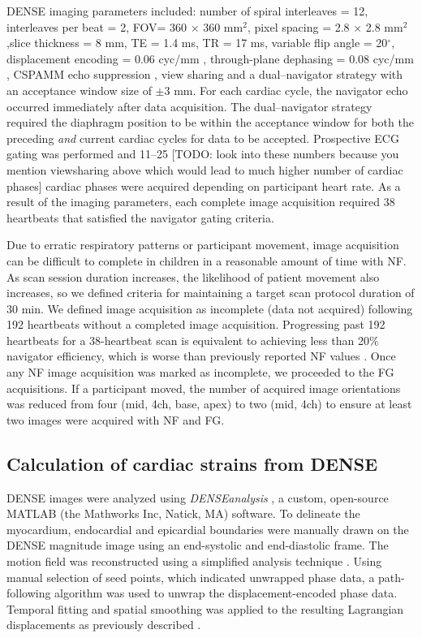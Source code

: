 	DENSE imaging parameters included: number of spiral interleaves = 12, interleaves per beat = 2, FOV= 360 × 360 mm$^2$, pixel spacing = 2.8 × 2.8 mm$^2$,slice thickness = 8 mm, TE = 1.4 ms, TR = 17 ms, variable flip angle = 20$^{\circ}$, displacement encoding = 0.06 cyc/mm \cite{Wehner2015a}, through-plane dephasing = 0.08 cyc/mm \cite{Zhong2006a}, CSPAMM echo suppression \cite{Kim2004}, view sharing and a dual--navigator strategy \cite{Hamlet2016a} with an acceptance window size of $\pm$3 mm. For each cardiac cycle, the navigator echo occurred immediately after data acquisition. The dual--navigator strategy required the diaphragm position to be within the acceptance window for both the preceding \textit{and} current cardiac cycles for data to be accepted. Prospective ECG gating was performed and 11--25 [TODO: look into these numbers because you mention viewsharing above which would lead to much higher number of cardiac phases] cardiac phases were acquired depending on participant heart rate. As a result of the imaging parameters, each complete image acquisition required 38 heartbeats that satisfied the navigator gating criteria.
	
	Due to erratic respiratory patterns or participant movement, image acquisition can be difficult to complete in children in a reasonable amount of time with NF. As scan session duration increases, the likelihood of patient movement also increases, so we defined criteria for maintaining a target scan protocol duration of 30 min. We defined image acquisition as incomplete (data not acquired) following 192 heartbeats without a completed image acquisition. Progressing past 192 heartbeats for a 38-heartbeat scan is equivalent to achieving less than 20\% navigator efficiency, which is worse than previously reported NF values \cite{Abd-Elmoniem2011,Feuerlein2009,Jhooti2011,Wang1996}. Once any NF image acquisition was marked as incomplete, we proceeded to the FG acquisitions. If a participant moved, the number of acquired image orientations was reduced from four (mid, 4ch, base, apex) to two (mid, 4ch) to ensure at least two images were acquired with NF and FG.

\subsection{Calculation of cardiac strains from DENSE}
	DENSE images were analyzed using \textit{DENSEanalysis} \cite{Gilliam2016a}, a custom, open-source MATLAB (the Mathworks Inc, Natick, MA) software. To delineate the myocardium, endocardial and epicardial boundaries were manually drawn on the DENSE magnitude image using an end-systolic and end-diastolic frame. The motion field was reconstructed using a simplified analysis technique \cite{Suever2014}. Using manual selection of seed points, which indicated unwrapped phase data, a path-following algorithm was used to unwrap the displacement-encoded phase data. Temporal fitting and spatial smoothing was applied to the resulting Lagrangian displacements as previously described \cite{Spottiswoode2007}.
	
